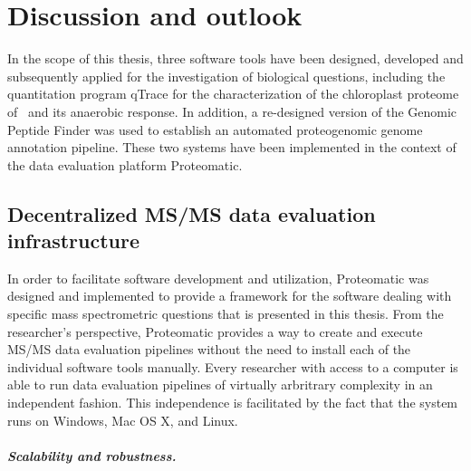 \cleardoublepage
\chapter{Discussion and outlook}

In the scope of this thesis, three software tools have been designed, 
developed and subsequently applied for the investigation of biological 
questions, including the quantitation program qTrace for the characterization 
of the chloroplast proteome of \cre~and its anaerobic response.
In addition, a re-designed version of the Genomic Peptide Finder was used
to establish an automated proteogenomic genome annotation pipeline.
These two systems have been implemented in the context of the data evaluation
platform Proteomatic.

\section{Decentralized MS/MS data evaluation infrastructure}

In order to facilitate software development and utilization, Proteomatic
was designed and implemented to provide a framework for the software
dealing with specific mass spectrometric questions that is presented in 
this thesis.
From the researcher's perspective, Proteomatic provides a way to create and
execute MS/MS data evaluation pipelines without the need to install each of
the individual software tools manually.
Every researcher with access to a computer is able to run data evaluation
pipelines of virtually arbritrary complexity in an independent fashion.
This independence is facilitated by the fact that the system runs on Windows,
Mac OS X, and Linux.

\paragraph{Scalability and robustness.}

